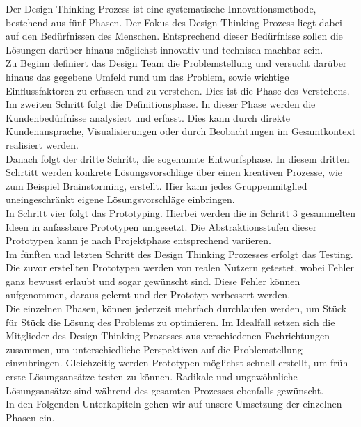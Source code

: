 Der Design Thinking Prozess ist eine systematische Innovationsmethode, bestehend aus fünf Phasen. Der Fokus des Design Thinking Prozess liegt dabei auf den Bedürfnissen des Menschen. Entsprechend dieser Bedürfnisse sollen die Lösungen darüber hinaus möglichst innovativ und technisch machbar sein.\\
Zu Beginn definiert das Design Team die Problemstellung und versucht darüber hinaus das gegebene Umfeld rund um das Problem, sowie wichtige Einflussfaktoren zu erfassen und zu verstehen. Dies ist die Phase des Verstehens.\\
Im zweiten Schritt folgt die Definitionsphase. In dieser Phase werden die Kundenbedürfnisse analysiert und erfasst. Dies kann durch direkte Kundenansprache, Visualisierungen oder durch Beobachtungen im Gesamtkontext realisiert werden.\\
Danach folgt der dritte Schritt, die sogenannte Entwurfsphase. In diesem dritten Schrtitt werden konkrete Lösungsvorschläge über einen kreativen Prozesse, wie zum Beispiel Brainstorming, erstellt. Hier kann jedes Gruppenmitglied uneingeschränkt eigene Lösungsvorschläge einbringen.\\
In Schritt vier folgt das Prototyping. Hierbei werden die in Schritt 3 gesammelten Ideen in anfassbare Prototypen umgesetzt. Die Abstraktionsstufen dieser Prototypen kann je nach Projektphase entsprechend variieren.\\
Im fünften und letzten Schritt des Design Thinking Prozesses erfolgt das Testing. Die zuvor erstellten Prototypen werden von realen Nutzern getestet, wobei Fehler ganz bewusst erlaubt und sogar gewünscht sind. Diese Fehler können aufgenommen, daraus gelernt und der Prototyp verbessert werden.\\
Die einzelnen Phasen, können jederzeit mehrfach durchlaufen werden, um Stück für Stück die Lösung des Problems zu optimieren. Im Idealfall setzen sich die Mitglieder des Design Thinking Prozesses aus verschiedenen Fachrichtungen zusammen, um unterschiedliche Perspektiven auf die Problemstellung einzubringen. Gleichzeitig werden Prototypen möglichst schnell erstellt, um früh erste Lösungsansätze testen zu können. Radikale und ungewöhnliche Lösungsansätze sind während des gesamten Prozesses ebenfalls gewünscht.\\
In den Folgenden Unterkapiteln gehen wir auf unsere Umsetzung der einzelnen Phasen ein.